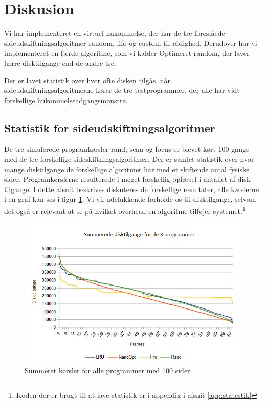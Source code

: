 \section{Diskusion}
\label{sec:diskusion}
Vi har implementeret en virtuel hukommelse, der har de tre foreslåede sideudskiftningsalgoritmer random, fifo og custom til rådighed. Derudover har vi implementeret en fjerde algoritme, som vi kalder Optimeret random, der laver færre disktilgange end de andre tre.

Der er lavet statistik over hvor ofte disken tilgås, når sideudskiftningsalgoritmerne kører de tre testprogrammer, der alle har vidt forskellige hukommelseadgangsmønstre. 

\subsection{Statistik for sideudskiftningsalgoritmer}
\label{subsec:statistik}
De tre simulerede programkørsler rand, scan og focus er blevet kørt 100 gange med de tre forskellige sideskiftningsalgoritmer. Der er samlet statistik over hvor mange disktilgange de forskellige algoritmer har med et skiftende antal fysiske sider. Programkørslerne resulterede i meget forskellig opførsel i antallet af disk tilgange. I dette afsnit beskrives diskuteres de forskellige resultater, alle kørslerne i en graf kan ses i figur \ref{fig:all}. Vi vil udelukkende forholde os til disktilgange, selvom det også er relevant at se på hvilket overhead en algoritme tilføjer systemet.\footnote{Koden der er brugt til at lave statistik er i appendix i afsnit \ref{app:statestik}}

\begin{figure}[ht]
\centerline{\includegraphics[scale=0.8]{graph/stat_all}}
\caption{Summeret kørsler for alle programmer med 100 sider}
\label{fig:all}
\end{figure}

